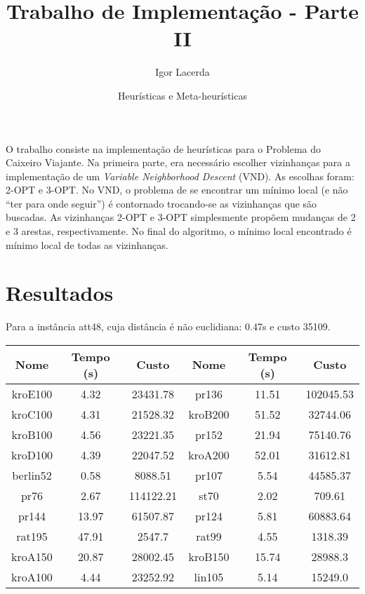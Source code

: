 \documentclass{article}
\author{Igor Lacerda}
\title{Trabalho de Implementação - Parte II}
\date{Heurísticas e Meta-heurísticas}
\begin{document}
\maketitle

O trabalho consiste na implementação de heurísticas para o Problema do Caixeiro Viajante. Na primeira parte, era necessário escolher vizinhanças para a implementação de um \textit{Variable Neighborhood Descent} (VND). As escolhas foram: 2-OPT e 3-OPT. No VND, o problema de se encontrar um mínimo local (e não ``ter para onde seguir'') é contornado trocando-se as vizinhanças que são buscadas. As vizinhanças 2-OPT e 3-OPT simplesmente propõem mudanças de 2 e 3 arestas, respectivamente. No final do algoritmo, o mínimo local encontrado é mínimo local de todas as vizinhanças.

\section*{Resultados}

Para a instância att48, cuja distância é não euclidiana: 0.47s e custo 35109.

\begin{tabular}{|| c c c | c c c ||}
    \hline
    Nome & Tempo (s) & Custo & Nome & Tempo (s) & Custo \\
    \hline
    kroE100 & 4.32 & 23431.78 & pr136 & 11.51 & 102045.53 \\
    kroC100 & 4.31 & 21528.32 & kroB200 & 51.52 & 32744.06 \\
    kroB100 & 4.56 & 23221.35 & pr152 & 21.94 & 75140.76 \\
    kroD100 & 4.39 & 22047.52 & kroA200 & 52.01 & 31612.81 \\
    berlin52 & 0.58 & 8088.51 & pr107 & 5.54 & 44585.37 \\
    pr76 & 2.67 & 114122.21 & st70 & 2.02 & 709.61 \\
    pr144 & 13.97 & 61507.87 & pr124 & 5.81 & 60883.64 \\
    rat195 & 47.91 & 2547.7 & rat99 & 4.55 & 1318.39 \\
    kroA150 & 20.87 & 28002.45 & kroB150 & 15.74 & 28988.3 \\
    kroA100 & 4.44 & 23252.92 & lin105 & 5.14 & 15249.0 \\
    \hline
\end{tabular}
\end{document}
